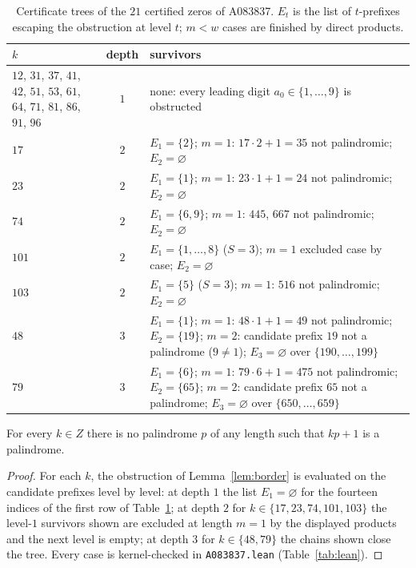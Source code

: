 \begin{table}[ht]
\centering
\small
{\footnotesize\setlength{\tabcolsep}{4pt}
\begin{tabular}{>{\raggedright\arraybackslash}p{4.4cm}|c|%
>{\raggedright\arraybackslash}p{10.2cm}}
\hline
$k$ & depth & survivors \\
\hline
$12$, $31$, $37$, $41$, $42$, $51$, $53$, $61$, $64$,
$71$, $81$, $86$, $91$, $96$ & $1$ & none: every leading
digit $a_0 \in \{1,\dots,9\}$ is obstructed \\
$17$ & $2$ & $E_1 = \{2\}$; $m = 1$: $17\cdot2+1 = 35$
not palindromic; $E_2 = \varnothing$ \\
$23$ & $2$ & $E_1 = \{1\}$; $m = 1$: $23\cdot1+1 = 24$
not palindromic; $E_2 = \varnothing$ \\
$74$ & $2$ & $E_1 = \{6,9\}$; $m = 1$: $445$, $667$
not palindromic; $E_2 = \varnothing$ \\
$101$ & $2$ & $E_1 = \{1,\dots,8\}$ ($S = 3$);
$m = 1$ excluded case by case; $E_2 = \varnothing$ \\
$103$ & $2$ & $E_1 = \{5\}$ ($S = 3$); $m = 1$:
$516$ not palindromic; $E_2 = \varnothing$ \\
$48$ & $3$ & $E_1 = \{1\}$; $m = 1$: $48\cdot1+1 = 49$
not palindromic; $E_2 = \{19\}$; $m = 2$: candidate
prefix $19$ not a palindrome ($9 \ne 1$);
$E_3 = \varnothing$ over $\{190,\dots,199\}$ \\
$79$ & $3$ & $E_1 = \{6\}$; $m = 1$: $79\cdot6+1 = 475$
not palindromic; $E_2 = \{65\}$; $m = 2$: candidate
prefix $65$ not a palindrome; $E_3 = \varnothing$
over $\{650,\dots,659\}$ \\
\hline
\end{tabular}}
\caption{Certificate trees of the $21$ certified zeros
of A083837. $E_t$ is the list of $t$-prefixes escaping
the obstruction at level $t$; $m < w$ cases are
finished by direct products.}
\label{tab:zeros}
\end{table}

\begin{theorem}
\label{thm:zeros}
For every $k \in Z$ there is no palindrome $p$ of any
length such that $kp+1$ is a palindrome.
\end{theorem}

\begin{proof}
For each $k$, the obstruction of
Lemma~\ref{lem:border} is evaluated on the candidate
prefixes level by level: at depth $1$ the list
$E_1 = \varnothing$ for the fourteen indices of the
first row of Table~\ref{tab:zeros}; at depth $2$ for
$k \in \{17,23,74,101,103\}$ the level-$1$ survivors
shown are excluded at length $m = 1$ by the displayed
products and the next level is empty; at depth $3$ for
$k \in \{48,79\}$ the chains shown close the tree.
Every case is kernel-checked in \texttt{A083837.lean}
(Table~\ref{tab:lean}).
\end{proof}

